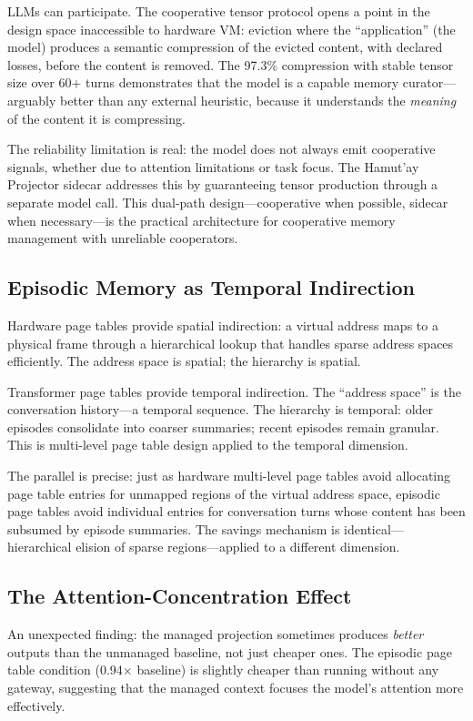 \documentclass[sigplan,screen,anonymous]{acmart}
\begin{document}
LLMs can participate. The cooperative tensor protocol opens a point
in the design space inaccessible to hardware VM: eviction where the
``application'' (the model) produces a semantic compression of the
evicted content, with declared losses, before the content is removed.
The 97.3\% compression with stable tensor size over 60+ turns
demonstrates that the model is a capable memory curator---arguably
better than any external heuristic, because it understands the
\emph{meaning} of the content it is compressing.

The reliability limitation is real: the model does not always emit
cooperative signals, whether due to attention limitations or task
focus. The Hamut'ay Projector sidecar addresses this by guaranteeing
tensor production through a separate model call. This dual-path
design---cooperative when possible, sidecar when necessary---is the
practical architecture for cooperative memory management with
unreliable cooperators.

\subsection{Episodic Memory as Temporal Indirection}

Hardware page tables provide spatial indirection: a virtual address
maps to a physical frame through a hierarchical lookup that handles
sparse address spaces efficiently. The address space is spatial; the
hierarchy is spatial.

Transformer page tables provide temporal indirection. The ``address
space'' is the conversation history---a temporal sequence. The
hierarchy is temporal: older episodes consolidate into coarser
summaries; recent episodes remain granular. This is multi-level page
table design applied to the temporal dimension.

The parallel is precise: just as hardware multi-level page tables
avoid allocating page table entries for unmapped regions of the
virtual address space, episodic page tables avoid individual entries
for conversation turns whose content has been subsumed by episode
summaries. The savings mechanism is identical---hierarchical
elision of sparse regions---applied to a different dimension.

\subsection{The Attention-Concentration Effect}

An unexpected finding: the managed projection sometimes produces
\emph{better} outputs than the unmanaged baseline, not just cheaper
ones. The episodic page table condition (0.94$\times$ baseline) is
slightly cheaper than running without any gateway, suggesting that
the managed context focuses the model's attention more effectively.
\end{document}
